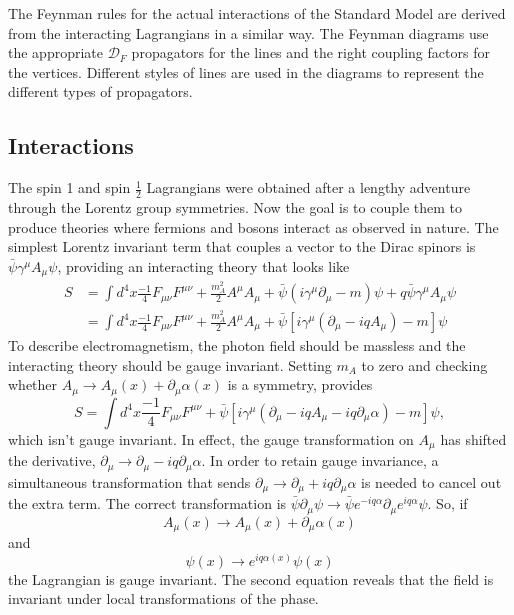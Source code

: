The Feynman rules for the actual interactions of the Standard Model are derived from the interacting Lagrangians in a similar way. The Feynman diagrams use the appropriate $\mathcal{D}_F$ propagators for the lines and the right coupling factors for the vertices. Different styles of lines are used in the diagrams to represent the different types of propagators. 

\subsection{Interactions}

The spin 1 and spin $\frac{1}{2}$ Lagrangians were obtained after a lengthy adventure through the Lorentz group symmetries. Now the goal is to couple them to produce theories where fermions and bosons interact as observed in nature. The simplest Lorentz invariant term that couples a vector to the Dirac spinors is $\bar{\psi}\gamma^\mu A_\mu \psi$, providing an interacting theory that looks like 
\begin{equation}
\begin{split}
S &= \int d^4x \frac{-1}{4}F_{\mu\nu}F^{\mu\nu} + \frac{m_A^2}{2} A^\mu A_\mu + \bar{\psi}\left(i\gamma^\mu\partial_\mu - m\right)\psi + q\bar{\psi}\gamma^\mu A_\mu \psi \\
&= \int d^4x \frac{-1}{4}F_{\mu\nu}F^{\mu\nu} + \frac{m_A^2}{2} A^\mu A_\mu + \bar{\psi}\left[i\gamma^\mu\left(\partial_\mu - iqA_\mu\right)- m \right]\psi 
\end{split}
\end{equation}
To describe electromagnetism, the photon field should be massless and the interacting theory should be gauge invariant. Setting $m_A$ to zero and checking whether $A_\mu \rightarrow A_\mu(x) + \partial_\mu\alpha(x)$ is a symmetry, provides  
\begin{equation}
S = \int d^4x \frac{-1}{4}F_{\mu\nu}F^{\mu\nu} + \bar{\psi}\left[i\gamma^\mu\left(\partial_\mu - iqA_\mu - iq\partial_\mu\alpha\right)- m \right]\psi, 
\end{equation}
which isn't gauge invariant. In effect, the gauge transformation on $A_\mu$ has shifted the derivative, $\partial_\mu \rightarrow \partial_\mu - iq\partial_\mu\alpha$. In order to retain gauge invariance, a simultaneous transformation that sends $\partial_\mu \rightarrow \partial_\mu + iq\partial_\mu\alpha$ is needed to cancel out the extra term. The correct transformation is $\bar{\psi}\partial_\mu\psi \rightarrow \bar{\psi} e^{-iq\alpha} \partial_\mu e^{iq\alpha} \psi$. So, if 
\begin{equation}
A_\mu(x) \rightarrow A_\mu(x) + \partial_\mu\alpha(x)
\end{equation}
and
\begin{equation}
\psi(x) \rightarrow e^{iq\alpha(x)}\psi(x) 
\end{equation}
the Lagrangian is gauge invariant. The second equation reveals that the field is invariant under local transformations of the phase. 

